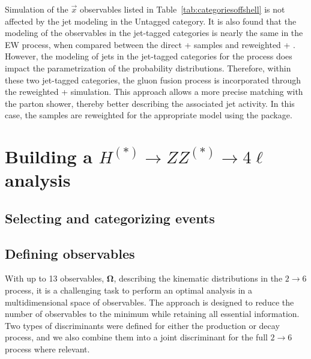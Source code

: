 Simulation of the $\vec{x}$ observables listed in Table~\ref{tab:categoriesoffshell}
is not affected by the jet modeling in the Untagged category. It is also found that the modeling
of the observables in the jet-tagged categories is nearly the same in the EW process, when 
compared between the direct \MCFM + \jhugen samples and reweighted \POWHEG + \jhugen. 
However, the modeling of jets in the jet-tagged categories for the \ggH process does impact 
the parametrization of the probability distributions. Therefore, within these two jet-tagged categories, 
the gluon fusion process is incorporated through the reweighted \POWHEG + \jhugen simulation. 
This approach allows a more precise matching with the parton shower, thereby 
better describing the associated jet activity. In this case, the samples are reweighted for the appropriate 
model using the \mela package.

\section{Building a $H^{(*)} \rightarrow ZZ^{(*)} \rightarrow 4\ell$ analysis}

\subsection{Selecting and categorizing events}

\subsection{Defining observables}

With up to 13 observables, $\boldsymbol{\Omega}$, describing the \Hboson kinematic distributions in the $2\to 6$ process,
it is a challenging task to perform an optimal analysis in a multidimensional space of observables. 
The \mela approach is designed to reduce the number of observables to the minimum while retaining all essential information. 
Two types of discriminants were defined for either the production or decay process, and we also combine them into a joint 
discriminant for the full $2\to 6$ process where relevant.


